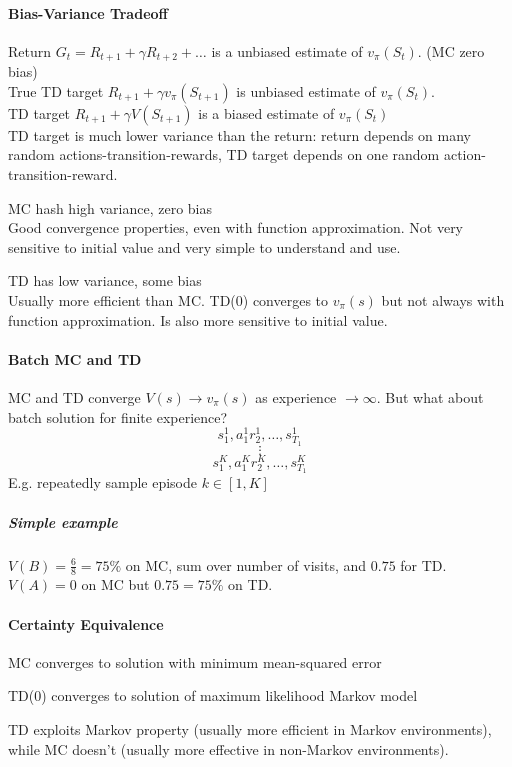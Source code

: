 \documentclass[10pt]{report}
\begin{document}
\paragraph{Bias-Variance Tradeoff} Return $G_t = R_{t+1} + \gamma R_{t+2}+\ldots$ is a unbiased estimate of $v_\pi(S_t)$. (MC zero bias)\\
True TD target $R_{t+1} + \gamma v_\pi(S_{t+1})$ is unbiased estimate of $v_\pi(S_t)$.\\
TD target $R_{t+1} + \gamma V(S_{t+1})$ is a biased estimate of $v_\pi(S_t)$\\
TD target is much lower variance than the return: return depends on many random actions-transition-rewards, TD target depends on one random action-transition-reward.
\begin{list}{}{}
	\item MC hash high variance, zero bias\\
	Good convergence properties, even with function approximation. Not very sensitive to initial value and very simple to understand and use.
	\item TD has low variance, some bias\\
	Usually more efficient than MC. TD(0) converges to $v_\pi(s)$ but not always with function approximation. Is also more sensitive to initial value.
\end{list}
\paragraph{Batch MC and TD} MC and TD converge $V(s) \rightarrow v_\pi(s)$ as experience $\rightarrow \infty$. But what about batch solution for finite experience?
$$s_1^1,a_1^1r_2^1,\ldots,s_{T_1}^1$$
$$\vdots$$
$$s_1^K,a_1^Kr_2^K,\ldots,s_{T_1}^K$$
E.g. repeatedly sample episode $k\in [1,K]$
\subparagraph{Simple example} $V(B)=\frac{6}{8}=75\%$ on MC, sum over number of visits, and $0.75$ for TD.\\
$V(A)=0$ on MC but $0.75=75\%$ on TD.
\paragraph{Certainty Equivalence}
\begin{list}{}{} %
	\item MC converges to solution with minimum mean-squared error
	\item TD(0) converges to solution of maximum likelihood Markov model
\end{list}
TD exploits Markov property (usually more efficient in Markov environments), while MC doesn't (usually more effective in non-Markov environments).
\end{document}
